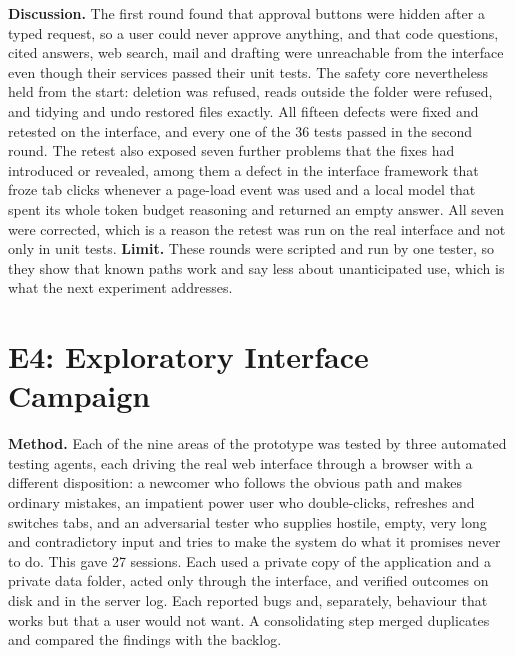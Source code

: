 \documentclass{FastFyp}
\begin{document}
\textbf{Discussion.} The first round found that approval buttons were hidden after a typed request, so a user could never approve anything, and that code questions, cited answers, web search, mail and drafting were unreachable from the interface even though their services passed their unit tests. The safety core nevertheless held from the start: deletion was refused, reads outside the folder were refused, and tidying and undo restored files exactly. All fifteen defects were fixed and retested on the interface, and every one of the 36 tests passed in the second round. The retest also exposed seven further problems that the fixes had introduced or revealed, among them a defect in the interface framework that froze tab clicks whenever a page-load event was used and a local model that spent its whole token budget reasoning and returned an empty answer. All seven were corrected, which is a reason the retest was run on the real interface and not only in unit tests. \textbf{Limit.} These rounds were scripted and run by one tester, so they show that known paths work and say less about unanticipated use, which is what the next experiment addresses.

\section{E4: Exploratory Interface Campaign}
\label{sec:campaign}
\textbf{Method.} Each of the nine areas of the prototype was tested by three automated testing agents, each driving the real web interface through a browser with a different disposition: a newcomer who follows the obvious path and makes ordinary mistakes, an impatient power user who double-clicks, refreshes and switches tabs, and an adversarial tester who supplies hostile, empty, very long and contradictory input and tries to make the system do what it promises never to do. This gave 27 sessions. Each used a private copy of the application and a private data folder, acted only through the interface, and verified outcomes on disk and in the server log. Each reported bugs and, separately, behaviour that works but that a user would not want. A consolidating step merged duplicates and compared the findings with the backlog.
\end{document}

